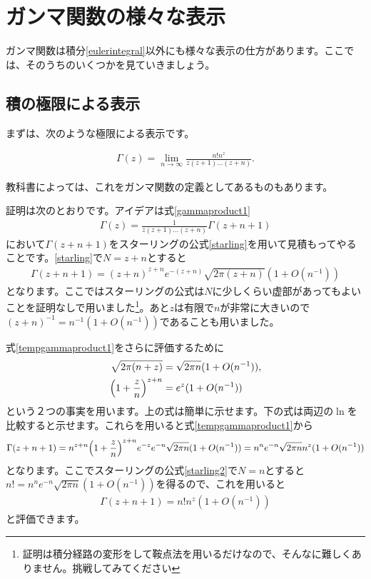 \documentclass[report,paper=a4, fontsize=12pt, line_length=16cm, number_of_lines=33,dvipdfmx]{jlreq}
\newenvironment{important}{\begin{tcolorbox}[
  colback = white,
  colframe = red!35,
  boxrule = 2mm,
  fonttitle = \bfseries,
  after = \noindent] }{\end{tcolorbox}}
\numberwithin{equation}{section}
\begin{document}
\section{ガンマ関数の様々な表示}
ガンマ関数は積分\eqref{eulerintegral}以外にも様々な表示の仕方があります。ここでは、そのうちのいくつかを見ていきましょう。
\subsection{積の極限による表示}
まずは、次のような極限による表示です。
\begin{important}
  \begin{align}
    \Gamma(z)=\lim_{n\to\infty}\frac{n!n^z}{z(z+1)\dots (z+n)}.
    \label{gammaproductlimit}
  \end{align}
\end{important}
教科書によっては、これをガンマ関数の定義としてあるものもあります。

証明は次のとおりです。アイデアは式\eqref{gammaproduct1}
\begin{align}
  \Gamma(z)=\frac{1}{z(z+1)\dots (z+n)}\Gamma(z+n+1)
  \label{gammaproduct1re}
\end{align}
において$\Gamma(z+n+1)$をスターリングの公式\eqref{starling}を用いて見積もってやることです。\eqref{starling}で$N=z+n$とすると
\begin{align}
  \Gamma(z+n+1)=(z+n)^{z+n}e^{-(z+n)}\sqrt{2\pi(z+n)}(1+O(n^{-1}))
  \label{tempgammaproduct1}
\end{align}
となります。ここではスターリングの公式は$N$に少しくらい虚部があってもよいことを証明なしで用いました\footnote{証明は積分経路の変形をして鞍点法を用いるだけなので、そんなに難しくありません。挑戦してみてください}。あと$z$は有限で$n$が非常に大きいので$(z+n)^{-1}=n^{-1}(1+O(n^{-1}))$であることも用いました。

式\eqref{tempgammaproduct1}をさらに評価するために
\begin{align}
  \sqrt{2\pi(n+z)}&=\sqrt{2\pi n}(1+O(n^{-1})),\\
  \qty(1+\frac{z}{n})^{z+n}&=e^{z}(1+O(n^{-1}))
\end{align}
という２つの事実を用います。上の式は簡単に示せます。下の式は両辺の$\ln$を比較すると示せます。これらを用いると式\eqref{tempgammaproduct1}から
\begin{align}
  \Gamma(z+n+1)=n^{z+n}\qty(1+\frac{z}{n})^{z+n}e^{-z}e^{-n}\sqrt{2\pi n}(1+O(n^{-1}))
  =n^n e^{-n}\sqrt{2\pi n}n^z(1+O(n^{-1}))
\end{align}
となります。ここでスターリングの公式\eqref{starling2}で$N=n$とすると$n!=n^ne^{-n}\sqrt{2\pi n}(1+O(n^{-1}))$を得るので、これを用いると
\begin{align}
  \Gamma(z+n+1)=n!n^z(1+O(n^{-1}))
\end{align}
と評価できます。
\end{document}
